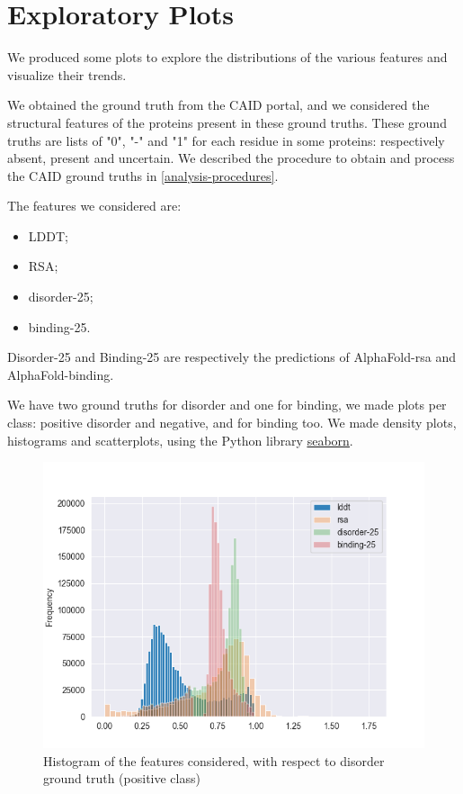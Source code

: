\section{Exploratory Plots}

We produced some plots to explore the distributions of the various features and visualize their trends.

We obtained the ground truth from the CAID portal, and we considered the structural features of the proteins present in these ground truths. These ground truths are lists of "0", "-" and "1" for each residue in some proteins: respectively absent, present and uncertain. We described the procedure to obtain and process the CAID ground truths in \ref{analysis-procedures}.

The features we considered are:

\begin{itemize}
    \item LDDT;
    \item RSA;
    \item disorder-25;
    \item binding-25.
\end{itemize}

Disorder-25 and Binding-25 are respectively the predictions of AlphaFold-rsa and AlphaFold-binding.

We have two ground truths for disorder and one for binding, we made plots per class: positive disorder and negative, and for binding too.
We made density plots, histograms and scatterplots, using the Python library \href{https://seaborn.pydata.org/}\underline{{seaborn}}.

\vspace{10em}

\begin{figure}[h!]
    \centering
    \includegraphics{res/analysis/plots/dis1-histplot_all.png}
    \caption{Histogram of the features considered, with respect to disorder ground truth (positive class)}
    \label{fig:hist}
\end{figure}

